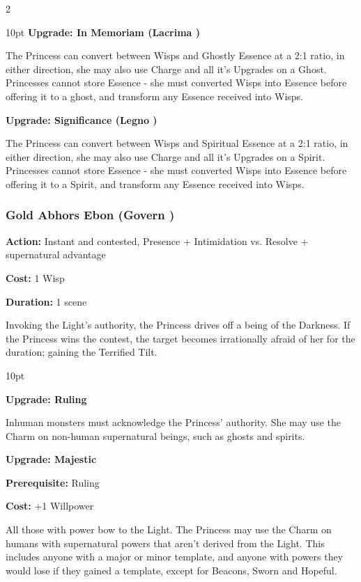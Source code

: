 \begin{multicols}{2}
\begin{myindentpar}{10pt}
\textbf{Upgrade: In Memoriam (Lacrima \textbullet\textbullet)}

The Princess can convert between Wisps and Ghostly Essence at a 2:1 ratio, in either direction, she may also use Charge and all it's Upgrades on a Ghost. Princesses cannot store Essence - she must converted Wisps into Essence before offering it to a ghost, and transform any Essence received into Wisps.

\textbf{Upgrade: Significance (Legno \textbullet\textbullet)}

The Princess can convert between Wisps and Spiritual Essence at a 2:1 ratio, in either direction, she may also use Charge and all it's Upgrades on a Spirit. Princesses cannot store Essence - she must converted Wisps into Essence before offering it to a Spirit, and transform any Essence received into Wisps.\end{myindentpar}

\subsubsection*{Gold Abhors Ebon (Govern \textbullet\textbullet)}

\noindent \textbf{Action:} Instant and contested, Presence + Intimidation vs. Resolve + supernatural advantage

\noindent \textbf{Cost:} 1 Wisp

\noindent \textbf{Duration:} 1 scene

\noindent Invoking the Light's authority, the Princess drives off a being of the Darkness. If the Princess wins the contest, the target becomes irrationally afraid of her for the duration; gaining the Terrified Tilt.

\begin{myindentpar}{10pt}

\textbf{Upgrade: Ruling}

Inhuman monsters must acknowledge the Princess' authority. She may use the Charm on non-human supernatural beings, such as ghosts and spirits.

\textbf{Upgrade: Majestic}

\noindent \textbf{Prerequisite:} Ruling

\noindent \textbf{Cost:} +1 Willpower

All those with power bow to the Light. The Princess may use the Charm on humans with supernatural powers that aren't derived from the Light. This includes anyone with a major or minor template, and anyone with powers they would lose if they gained a template, except for Beacons, Sworn and Hopeful.


\end{myindentpar}
\end{multicols}
